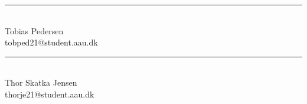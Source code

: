 \vspace{20 mm} 
\begin{minipage}[b]{0.45\textwidth}
 \centering
 \rule{\textwidth}{0.5pt}\\
  Tobias Pedersen \\
 {\footnotesize tobped21@student.aau.dk}
\end{minipage}
\hfill
\begin{minipage}[b]{0.45\textwidth}
 \centering
 \rule{\textwidth}{0.5pt}\\
 Thor Skatka Jensen \\
 {\footnotesize thorje21@student.aau.dk }
\end{minipage}
